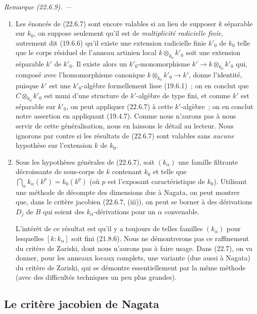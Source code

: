\documentclass[10pt,oneside]{book}
\makeatletter
\newcommand{\setmanualcurrentlabel}[1]{\def\@currentlabel{#1}}
\newcommand{\oldpage}[2][]{%
  \setcounter{footnote}{0}%
  \marginpar{\scriptsize\textbf{#1}~|~#2}\ignorespaces}
\newenvironment{remark}[1][]{%
  \setmanualcurrentlabel{#1}\par\medskip\noindent\itshape Remarque (#1). ---\ }{\par}
\makeatother
\begin{document}
\begin{remark}[22.6.9]
\label{0.22.6.9-fr}
\begin{enumerate}
  \item[\rm(i)] Les énoncés de (22.6.7) sont encore valables si au lieu de
  supposer $k$ séparable sur $k_0$, on suppose seulement qu'il est de
  \emph{multiplicité radicielle finie}, autrement dit (19.6.6) qu'il existe
  une extension radicielle finie $k'_0$ de $k_0$ telle que le corps résiduel de
  l'anneau artinien local $k\otimes_{k_0}k'_0$ soit une extension séparable
  $k'$ de $k'_0$. Il existe alors un $k'_0$-monomorphisme
  $k'\longrightarrow k\otimes_{k_0}k'_0$ qui, composé avec l'homomorphisme
  canonique $k\otimes_{k_0}k'_0\longrightarrow k'$, donne l'identité, puisque
  $k'$ est une $k'_0$-algèbre formellement lisse (19.6.1)~; on en conclut que
  $C\otimes_{k_0}k'_0$ est muni d'une structure de $k'$-algèbre de type fini,
  et comme $k'$ est séparable sur $k'_0$, on peut appliquer (22.6.7) à cette
  $k'$-algèbre~; on en conclut notre assertion en appliquant (19.4.7). Comme
  nous n'aurons pas à nous servir de cette généralisation, nous en laissons le
  détail au lecteur. Nous ignorons par contre si les résultats de (22.6.7) sont
  valables sans \emph{aucune} hypothèse sur l'extension $k$ de $k_0$.
  \item[\rm(ii)] Sous les hypothèses générales de (22.6.7), soit $(k_\alpha)$
  une famille filtrante décroissante de sous-corps de $k$ contenant $k_0$ et
  telle que
  $\bigcap_\alpha k_\alpha(k^p)=k_0(k^p)$ (où $p$ est l'exposant
  caractéristique de $k_0$). Utilisant une méthode de décompte des dimensions
  due à Nagata, on peut montrer que, dans le critère jacobien (22.6.7, (iii)),
  on peut se borner à des dérivations $D_j$ de $B$ qui soient des
  $k_\alpha$-dérivations pour un $\alpha$ convenable.

  \oldpage[0\textsubscript{IV-1}]{209}

  L'intérêt de ce résultat est qu'il y a toujours de telles familles
  $(k_\alpha)$ pour lesquelles $[k:k_\alpha]$ soit fini (21.8.6). Nous ne
  démontrerons pas ce raffinement du critère de Zariski, dont nous n'aurons pas
  à faire usage. Dans (22.7), on va donner, pour les anneaux locaux complets,
  une variante (due aussi à Nagata) du critère de Zariski, qui se démontre
  essentiellement par la même méthode (avec des difficultés techniques un peu
  plus grandes).
\end{enumerate}
\end{remark}

\subsection{Le critère jacobien de Nagata}
\label{subsection:0.22.7-fr}
\end{document}
